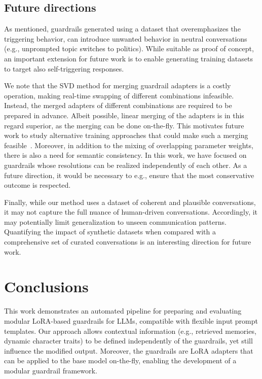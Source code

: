 \documentclass[letterpaper]{article}
\begin{document}
\subsection{Future directions}
As mentioned, guardrails generated using a dataset that overemphasizes the triggering behavior, can introduce unwanted behavior in neutral conversations  (e.g., unprompted topic switches to politics). While suitable as proof of concept, an important extension for future work is to enable generating training datasets to target also self-triggering responses. 

We note that the SVD method for merging guardrail adapters is a costly operation, making real-time swapping of different combinations infeasible.  Instead, the merged adapters of different combinations are required to be prepared in advance. Albeit possible, linear merging of the adapters is in this regard superior, as the merging can be done on-the-fly. This motivates future work to study alternative training approaches that could make such a merging feasible~\cite{hu2024learn}. Moreover, in addition to the mixing of overlapping parameter weights, there is also a need for semantic consistency. In this work, we have focused on guardrails whose resolutions can be realized independently of each other. As a future direction, it would be necessary to e.g., ensure that the most conservative outcome is respected. 

Finally, while our method uses a dataset of coherent and plausible conversations, it may not capture the full nuance of human-driven conversations. Accordingly, it may potentially limit generalization to unseen communication patterns. Quantifying the impact of synthetic datasets when compared with a comprehensive set of curated conversations is an interesting direction for future work. 

\section{Conclusions}
This work demonstrates an automated pipeline for preparing and evaluating modular LoRA-based guardrails for LLMs, compatible with flexible input prompt templates. Our approach allows contextual information (e.g., retrieved memories, dynamic character traits) to be defined independently of the guardrails, yet still influence the modified output. Moreover, the guardrails are LoRA adapters that can be applied to the base model on-the-fly, enabling the development of a modular guardrail framework.
\end{document}
